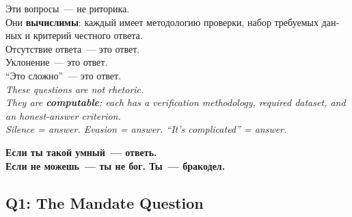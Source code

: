 \documentclass[11pt,a4paper]{article}
\theoremstyle{definition}
\theoremstyle{remark}
\begin{document}
\begin{sichbox}
\foreignlanguage{russian}{
Эти вопросы~--- не риторика.\\
Они \textbf{вычислимы}: каждый имеет методологию проверки,
набор требуемых данных и критерий честного ответа.\\[0.2cm]
Отсутствие ответа~--- это ответ.\\
Уклонение~--- это ответ.\\
``Это сложно''~--- это ответ.\\[0.2cm]
}
\textit{These questions are not rhetoric.\\
They are \textbf{computable}: each has a verification methodology,
required dataset, and an honest-answer criterion.\\[0.1cm]
Silence = answer. Evasion = answer.
``It's complicated'' = answer.}\\[0.2cm]
\begin{center}
{\color{accentcolor}
\foreignlanguage{russian}{
\textbf{Если ты такой умный~--- ответь.\\
Если не можешь~--- ты не бог. Ты~--- бракодел.}
}
}
\end{center}
\end{sichbox}

\vspace{0.4cm}

\subsection{Q1: The Mandate Question}
\label{sec:q1}
\end{document}
